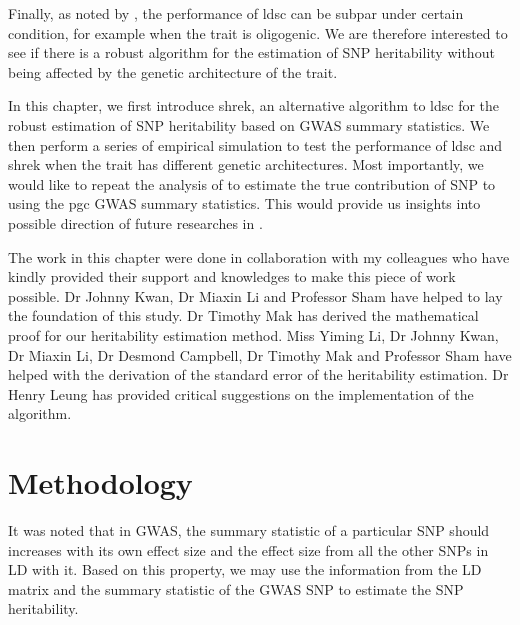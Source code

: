 \documentclass[12pt]{scrbook}
\newcommand*{\glng}{\glsentrylong}
\begin{document}
Finally, as noted by \citet{Bulik-Sullivan2015}, the performance of \gls{ldsc} can be subpar under certain condition, for example when the trait is oligogenic.
We are therefore interested to see if there is a robust algorithm for the estimation of \gls{SNP} heritability without being affected by the genetic architecture of the trait.

In this chapter, we first introduce \gls{shrek}, an alternative algorithm to \gls{ldsc} for the robust estimation of \gls{SNP} heritability based on \gls{GWAS} summary statistics.
We then perform a series of empirical simulation to test the performance of \gls{ldsc} and \gls{shrek} when the trait has different genetic architectures. 
Most importantly, we would like to repeat the analysis of \citet{Bulik-Sullivan2015} to estimate the true contribution of \gls{SNP} to \glng{scz} using the \gls{pgc} \glng{scz} \gls{GWAS} summary statistics.
This would provide us insights into possible direction of future researches in \glng{scz}.

The work in this chapter were done in collaboration with my colleagues who have kindly provided their support and knowledges to make this piece of work possible.
Dr Johnny Kwan, Dr Miaxin Li and Professor Sham have helped to lay the foundation of this study. 
Dr Timothy Mak has derived the mathematical proof for our heritability estimation method. 
Miss Yiming Li, Dr Johnny Kwan, Dr Miaxin Li, Dr Desmond Campbell, Dr Timothy Mak and Professor Sham have helped with the derivation of the standard error of the heritability estimation. 
Dr Henry Leung has provided critical suggestions on the implementation of the algorithm.

\section{Methodology}	
It was noted that in \gls{GWAS}, the summary statistic of a particular \gls{SNP} should increases with its own effect size and the effect size from all the other \glspl{SNP} in \gls{LD} with it.
Based on this property, we may use the information from the \gls{LD} matrix and the summary statistic of the \gls{GWAS} \gls{SNP} to estimate the \gls{SNP} heritability.
\end{document}

